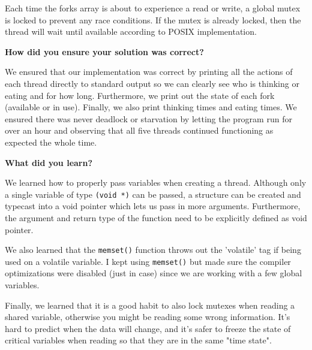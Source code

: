 \documentclass[10pt,letterpaper,draftclsnofoot,onecolumn]{IEEEtran}
\begin{document}
\medskip

\noindent Each time the forks array is about to experience a read or write, a global mutex is locked to prevent any race conditions. If the mutex is already locked, then the thread will wait until available according to POSIX implementation.\par

\bigskip

\noindent\textbf{How did you ensure your solution was correct?}
\medskip

\medskip

\noindent We ensured that our implementation was correct by printing all the actions of each thread directly to standard output so we can clearly see who is thinking or eating and for how long. Furthermore, we print out the state of each fork (available or in use). Finally, we also print thinking times and eating times. We ensured there was never deadlock or starvation by letting the program run for over an hour and observing that all five threads continued functioning as expected the whole time.\par

\bigskip

\noindent\textbf{What did you learn?}
\medskip

\medskip

\noindent We learned how to properly pass variables when creating a thread. Although only a single variable of type \texttt{(void *)} can be passed, a structure can be created and typecast into a void pointer which lets us pass in more arguments. Furthermore, the argument and return type of the function need to be explicitly defined as void pointer.\par
\medskip

\medskip

\noindent We also learned that the \texttt{memset()} function throws out the 'volatile' tag if being used on a volatile variable. I kept using \texttt{memset()} but made sure the compiler optimizations were disabled (just in case) since we are working with a few global variables.\par
\medskip

\medskip

\noindent Finally, we learned that it is a good habit to also lock mutexes when reading a shared variable, otherwise you might be reading some wrong information. It's hard to predict when the data will change, and it's safer to freeze the state of critical variables when reading so that they are in the same "time state".\par\pagebreak
\end{document}
